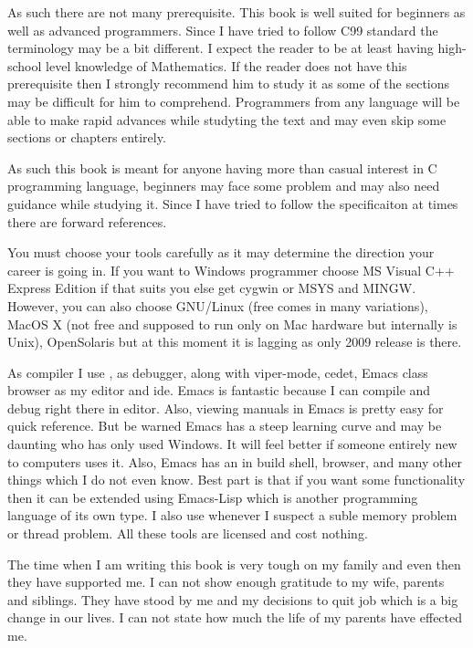 \subject{Prerequisite}
As such there are not many prerequisite. This book is well suited for
beginners as well as advanced programmers. Since I have tried to
follow C99 standard the terminology may be a bit different. I expect
the reader to be at least having high-school level knowledge of
Mathematics. If the reader does not have this prerequisite then I
strongly recommend him to study it as some of the sections may be
difficult for him to comprehend. Programmers from any language will be
able to make rapid advances while studyting the text and may even skip
some sections or chapters entirely.

As such this book is meant for anyone having more than casual interest
in C programming language, beginners may face some problem and may
also need guidance while studying it. Since I have tried to follow the
specificaiton at times there are forward references.

\subject{Tools}
You must choose your tools carefully as it may determine the direction
your career is going in. If you want to Windows programmer choose MS
Visual C++ Express Edition if that suits you else get cygwin or MSYS
and MINGW. However, you can also choose GNU/Linux (free comes in many
variations), MacOS X (not free and supposed to run only on Mac
hardware but internally is Unix), OpenSolaris but at this moment it is
lagging as only 2009 release is there.

As compiler I use ,  as debugger, 
along with viper-mode, cedet, Emacs class browser as my editor and
ide. Emacs is fantastic because I can compile and debug right there in
editor. Also, viewing manuals in Emacs is pretty easy for quick
reference. But be warned Emacs has a steep learning curve and may be
daunting who has only used Windows. It will feel better if someone
entirely new to computers uses it. Also, Emacs has an in build shell,
browser, and many other things which I do not even know. Best part is
that if you want some functionality then it can be extended using
Emacs-Lisp which is another programming language of its own type.
I also use  whenever I suspect a suble memory problem
or thread problem. All these tools are licensed and cost nothing.

\subject{Acknowledgements}
The time when I am writing this book is very tough on my family and
even then they have supported me. I can not show enough gratitude to
my wife, parents and siblings. They have stood by me and my decisions
to quit job which is a big change in our lives. I can not state how
much the life of my parents have effected me.

